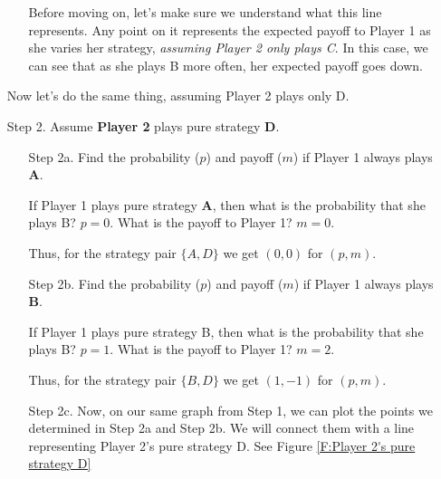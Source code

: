\begin{itemize}
\begin{itemize}
Before moving on, let's make sure we understand what this line represents. Any point on it represents the expected payoff to Player 1 as she varies her strategy, \emph{assuming Player 2 only plays C}. In this case, we can see that as she plays B more often, her expected payoff goes down. 
\end{itemize}

Now let's do the same thing, assuming Player 2 plays only D.

\item[Step 2.] Assume \textbf{Player 2} plays pure strategy \textbf{D}.
\begin{itemize}
\item[Step 2a.] Find the probability ($p$) and payoff ($m$) if Player 1 always plays \textbf{A}.

If Player 1 plays pure strategy \textbf{A}, then what is the probability that she plays B? $p=0$. What is the payoff to Player 1? $m=0$. 

Thus, for the strategy pair $\{A, D\}$ we get $(0, 0)$ for $(p, m)$.

\item[Step 2b.] Find the probability ($p$) and payoff ($m$) if Player 1 always plays \textbf{B}.

If Player 1 plays pure strategy B, then what is the probability that she plays B? $p=1$. What is the payoff to Player 1? $m=2$. 

Thus, for the strategy pair $\{B, D\}$ we get $(1, -1)$ for $(p, m)$.

\item[Step 2c.] Now, on our same graph from Step 1, we can plot the points we determined in Step 2a and Step 2b. We will connect them with a line representing Player 2's pure strategy D. See Figure \ref{F:Player 2's pure strategy D}


\begin{figure}
\begin{center}
\end{center}
\end{figure}
\end{itemize}
\end{itemize}
